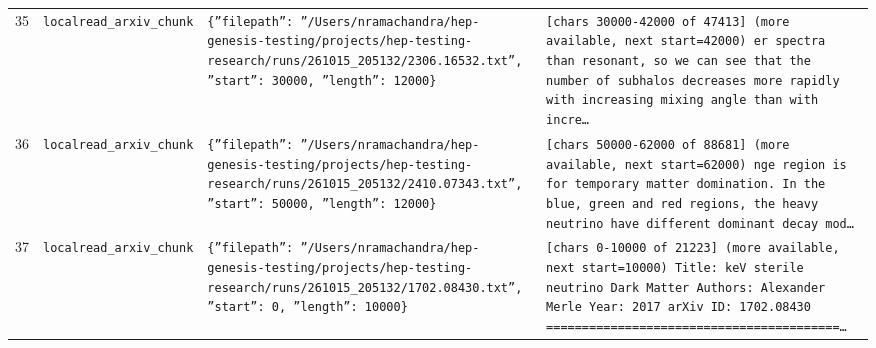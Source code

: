 \documentclass[11pt,a4paper]{article}
\begin{document}
\begin{longtable}{@{}p{}p{}p{}p{}@{}}
35 & \texttt{local}\newline\texttt{read\_\allowbreak{}arxiv\_\allowbreak{}chunk} & \texttt{\{''filepath'':\allowbreak{} ''/\allowbreak{}Users/\allowbreak{}nramachandra/\allowbreak{}hep-genesis-testing/\allowbreak{}projects/\allowbreak{}hep-testing-research/\allowbreak{}runs/\allowbreak{}261015\_\allowbreak{}205132/\allowbreak{}2306.16532.txt'',\allowbreak{} ''start'':\allowbreak{} 30000,\allowbreak{} ''length'':\allowbreak{} 12000\}\allowbreak{}} & \texttt{[chars 30000-42000 of 47413]\allowbreak{} (more available,\allowbreak{} next start=\allowbreak{}42000)\allowbreak{}  er spectra than resonant,\allowbreak{} so we can see that the number of subhalos decreases more rapidly with increasing mixing angle than with incre\ldots{}\allowbreak{}} \\
36 & \texttt{local}\newline\texttt{read\_\allowbreak{}arxiv\_\allowbreak{}chunk} & \texttt{\{''filepath'':\allowbreak{} ''/\allowbreak{}Users/\allowbreak{}nramachandra/\allowbreak{}hep-genesis-testing/\allowbreak{}projects/\allowbreak{}hep-testing-research/\allowbreak{}runs/\allowbreak{}261015\_\allowbreak{}205132/\allowbreak{}2410.07343.txt'',\allowbreak{} ''start'':\allowbreak{} 50000,\allowbreak{} ''length'':\allowbreak{} 12000\}\allowbreak{}} & \texttt{[chars 50000-62000 of 88681]\allowbreak{} (more available,\allowbreak{} next start=\allowbreak{}62000)\allowbreak{}  nge region is for temporary matter domination. In the blue,\allowbreak{} green and red regions,\allowbreak{} the heavy neutrino have different dominant decay mod\ldots{}\allowbreak{}} \\
37 & \texttt{local}\newline\texttt{read\_\allowbreak{}arxiv\_\allowbreak{}chunk} & \texttt{\{''filepath'':\allowbreak{} ''/\allowbreak{}Users/\allowbreak{}nramachandra/\allowbreak{}hep-genesis-testing/\allowbreak{}projects/\allowbreak{}hep-testing-research/\allowbreak{}runs/\allowbreak{}261015\_\allowbreak{}205132/\allowbreak{}1702.08430.txt'',\allowbreak{} ''start'':\allowbreak{} 0,\allowbreak{} ''length'':\allowbreak{} 10000\}\allowbreak{}} & \texttt{[chars 0-10000 of 21223]\allowbreak{} (more available,\allowbreak{} next start=\allowbreak{}10000)\allowbreak{}  Title:\allowbreak{} keV sterile neutrino Dark Matter Authors:\allowbreak{} Alexander Merle Year:\allowbreak{} 2017 arXiv ID:\allowbreak{} 1702.08430  =\allowbreak{}=\allowbreak{}=\allowbreak{}=\allowbreak{}=\allowbreak{}=\allowbreak{}=\allowbreak{}=\allowbreak{}=\allowbreak{}=\allowbreak{}=\allowbreak{}=\allowbreak{}=\allowbreak{}=\allowbreak{}=\allowbreak{}=\allowbreak{}=\allowbreak{}=\allowbreak{}=\allowbreak{}=\allowbreak{}=\allowbreak{}=\allowbreak{}=\allowbreak{}=\allowbreak{}=\allowbreak{}=\allowbreak{}=\allowbreak{}=\allowbreak{}=\allowbreak{}=\allowbreak{}=\allowbreak{}=\allowbreak{}=\allowbreak{}=\allowbreak{}=\allowbreak{}=\allowbreak{}=\allowbreak{}=\allowbreak{}=\allowbreak{}=\allowbreak{}=\allowbreak{}\ldots{}\allowbreak{}} \\

\end{longtable}
\end{document}
